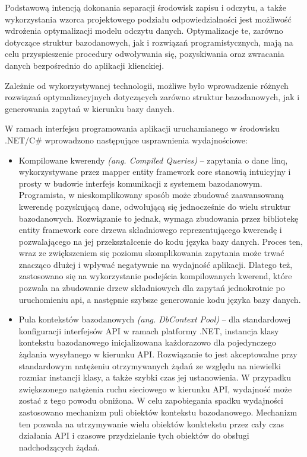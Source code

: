 Podstawową intencją dokonania separacji środowisk zapisu i odczytu, a także wykorzystania wzorca projektowego podziału odpowiedzialności jest możliwość wdrożenia optymalizacji modelu odczytu danych. Optymalizacje te, zarówno dotyczące struktur bazodanowych, jak i rozwiązań programistycznych, mają na celu przyspieszenie procedury odwoływania się, pozyskiwania oraz zwracania danych bezpośrednio do aplikacji klienckiej.  

Zależnie od wykorzystywanej technologii, możliwe było wprowadzenie różnych rozwiązań optymalizacyjnych dotyczących zarówno struktur bazodanowych, jak i generowania zapytań w kierunku bazy danych.

W ramach interfejsu programowania aplikacji uruchamianego w środowisku .NET/C\# wprowadzono następujące usprawnienia wydajnościowe:
\begin{itemize}
    \item Kompilowane kwerendy \textit{(ang. Compiled Queries)} -- zapytania o dane linq, wykorzystywane przez mapper entity framework core stanowią intuicyjny i prosty w budowie interfejs komunikacji z systemem bazodanowym. Programista, w nieskomplikowany sposób może zbudować zaawansowaną kwerendę pozyskującą dane, odwołującą się jednocześnie do wielu struktur bazodanowych. Rozwiązanie to jednak, wymaga zbudowania przez bibliotekę entity framework core drzewa składniowego reprezentującego kwerendę i pozwalającego na jej przekształcenie do kodu języka bazy danych. Proces ten, wraz ze zwiększeniem się poziomu skomplikowania zapytania może trwać znacząco dłużej i wpływać negatywnie na wydajność aplikacji. Dlatego też, zastosowano się na wykorzystanie podejścia kompilowanych kwerend, które pozwala na zbudowanie drzew składniowych dla zapytań jednokrotnie po uruchomieniu api, a następnie szybsze generowanie kodu języka bazy danych.
    \item Pula kontekstów bazodanowych \textit{(ang. DbContext Pool)} -- dla standardowej konfiguracji interfejsów API w ramach platformy .NET, instancja klasy kontekstu bazodanowego inicjalizowana każdorazowo dla pojedynczego żądania wysyłanego w kierunku API. Rozwiązanie to jest akceptowalne przy standardowym natężeniu otrzymywanych żądań ze względu na niewielki rozmiar instancji klasy, a także szybki czas jej ustanowienia. W przypadku zwiększonego natężenia ruchu sieciowego w kierunku API, wydajność może zostać z tego powodu obniżona. W celu zapobiegania spadku wydajności zastosowano mechanizm puli obiektów kontekstu bazodanowego. Mechanizm ten pozwala na utrzymywanie wielu obiektów konktekstu przez cały czas działania API i czasowe przydzielanie tych obiektów do obsługi nadchodzących żądań.

\end{itemize}
